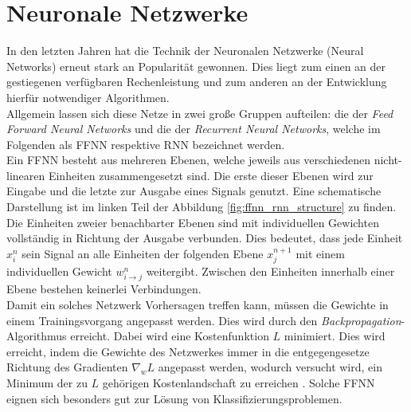 \section{Neuronale Netzwerke}
In den letzten Jahren hat die Technik der Neuronalen Netzwerke (Neural Networks) erneut stark an Popularität gewonnen. Dies liegt zum einen an der gestiegenen verfügbaren Rechenleistung und zum anderen an der Entwicklung hierfür notwendiger Algorithmen.\\
Allgemein lassen sich diese Netze in zwei große Gruppen aufteilen: die der \textit{Feed Forward Neural Networks} und die der \textit{Recurrent Neural Networks}, welche im Folgenden als \textsc{FFNN} respektive \textsc{RNN} bezeichnet werden.\\

Ein \textsc{FFNN} besteht aus mehreren Ebenen, welche jeweils aus verschiedenen nicht-linearen Einheiten zusammengesetzt sind. Die erste dieser Ebenen wird zur Eingabe und die letzte zur Ausgabe eines Signals genutzt. Eine schematische Darstellung ist im linken Teil der Abbildung \ref{fig:ffnn_rnn_structure} zu finden. Die Einheiten zweier benachbarter Ebenen sind mit individuellen Gewichten vollständig in Richtung der Ausgabe verbunden. Dies bedeutet, dass jede Einheit $x^n_i$ sein Signal an alle Einheiten der folgenden Ebene $x^{n+1}_j$ mit einem individuellen Gewicht $w^n_{i \rightarrow j}$ weitergibt. Zwischen den Einheiten innerhalb einer Ebene bestehen keinerlei Verbindungen.\\
Damit ein solches Netzwerk Vorhersagen treffen kann, müssen die Gewichte in einem Trainingsvorgang angepasst werden. Dies wird durch den \textit{Backpropagation}-Algorithmus erreicht. Dabei wird eine Kostenfunktion $L$ minimiert. Dies wird erreicht, indem die Gewichte des Netzwerkes immer in die entgegengesetze Richtung des Gradienten $\nabla_w L$ angepasst werden, wodurch versucht wird, ein Minimum der zu $L$ gehörigen Kostenlandschaft zu erreichen \cite[S. 225-290]{bishop}. Solche \textsc{FFNN} eignen sich besonders gut zur Lösung von Klassifizierungsproblemen.\\

